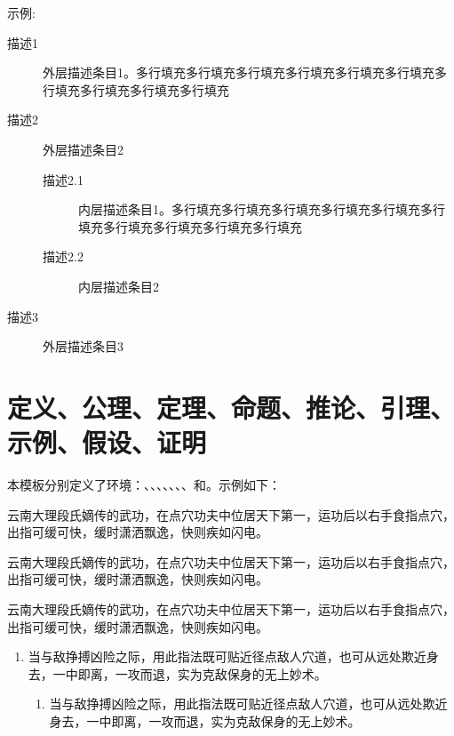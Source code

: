 \documentclass[print, doctor, vlined]{DissertUESTC}
\begin{document}
	\null

	示例:

	\begin{description}
		\item[描述1] 外层描述条目1。多行填充多行填充多行填充多行填充多行填充多行填充多行填充多行填充多行填充多行填充
		\item[描述2] 外层描述条目2
		\begin{description}
			\item[描述2.1] 内层描述条目1。多行填充多行填充多行填充多行填充多行填充多行填充多行填充多行填充多行填充多行填充
			\item[描述2.2] 内层描述条目2
		\end{description}
		\item[描述3] 外层描述条目3
	\end{description}
	
	\clearpage
	\section{定义、公理、定理、命题、推论、引理、示例、假设、证明}
	
	本模板分别定义了环境：、、、、、、、和。示例如下：
	

	\begin{definition}[具体名称]
		云南大理段氏嫡传的武功，在点穴功夫中位居天下第一，运功后以右手食指点穴，出指可缓可快，缓时潇洒飘逸，快则疾如闪电。
	\end{definition}

	\begin{axiom}[具体名称]
		云南大理段氏嫡传的武功，在点穴功夫中位居天下第一，运功后以右手食指点穴，出指可缓可快，缓时潇洒飘逸，快则疾如闪电。
	\end{axiom}
	
	\begin{theorem}[具体名称]
		云南大理段氏嫡传的武功，在点穴功夫中位居天下第一，运功后以右手食指点穴，出指可缓可快，缓时潇洒飘逸，快则疾如闪电。

		\begin{enumerate}
			\item 当与敌挣搏凶险之际，用此指法既可贴近径点敌人穴道，也可从远处欺近身去，一中即离，一攻而退，实为克敌保身的无上妙术。
			\begin{enumerate}
				\item 当与敌挣搏凶险之际，用此指法既可贴近径点敌人穴道，也可从远处欺近身去，一中即离，一攻而退，实为克敌保身的无上妙术。
			\end{enumerate}
		\end{enumerate}
	\end{theorem}
	
\end{document}
